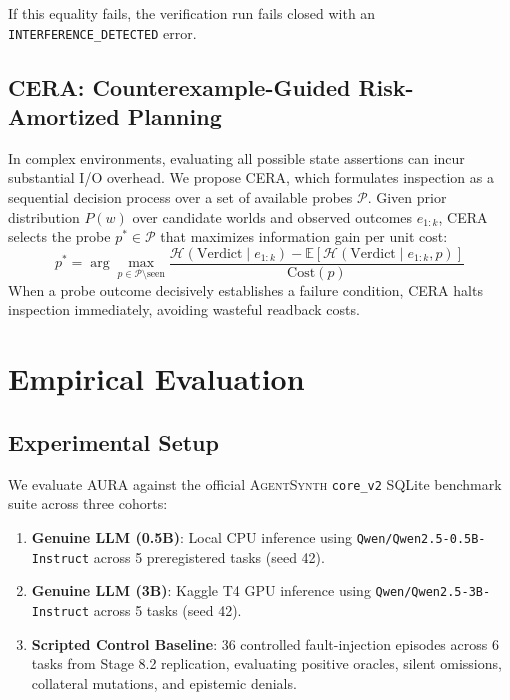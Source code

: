 \documentclass[11pt,a4paper]{article}
\newcommand{\aura}{\textsc{AURA}}
\newcommand{\cera}{\textsc{CERA}}
\newcommand{\agentsynth}{\textsc{AgentSynth}}
\begin{document}
If this equality fails, the verification run fails closed with an \texttt{INTERFERENCE\_DETECTED} error.

\subsection{CERA: Counterexample-Guided Risk-Amortized Planning}
In complex environments, evaluating all possible state assertions can incur substantial I/O overhead. We propose \cera{}, which formulates inspection as a sequential decision process over a set of available probes $\mathcal{P}$. Given prior distribution $P(w)$ over candidate worlds and observed outcomes $e_{1:k}$, \cera{} selects the probe $p^* \in \mathcal{P}$ that maximizes information gain per unit cost:
$$p^* = \arg\max_{p \in \mathcal{P} \setminus \text{seen}} \frac{\mathcal{H}(\text{Verdict} \mid e_{1:k}) - \mathbb{E}[\mathcal{H}(\text{Verdict} \mid e_{1:k}, p)]}{\text{Cost}(p)}$$
When a probe outcome decisively establishes a failure condition, \cera{} halts inspection immediately, avoiding wasteful readback costs.

\section{Empirical Evaluation}

\subsection{Experimental Setup}
We evaluate \aura{} against the official \agentsynth{} \texttt{core\_v2} SQLite benchmark suite across three cohorts:
\begin{enumerate}
    \item \textbf{Genuine LLM (0.5B)}: Local CPU inference using \texttt{Qwen/Qwen2.5-0.5B-Instruct} across 5 preregistered tasks (seed 42).
    \item \textbf{Genuine LLM (3B)}: Kaggle T4 GPU inference using \texttt{Qwen/Qwen2.5-3B-Instruct} across 5 tasks (seed 42).
    \item \textbf{Scripted Control Baseline}: 36 controlled fault-injection episodes across 6 tasks from Stage 8.2 replication, evaluating positive oracles, silent omissions, collateral mutations, and epistemic denials.
\end{enumerate}


\end{document}
